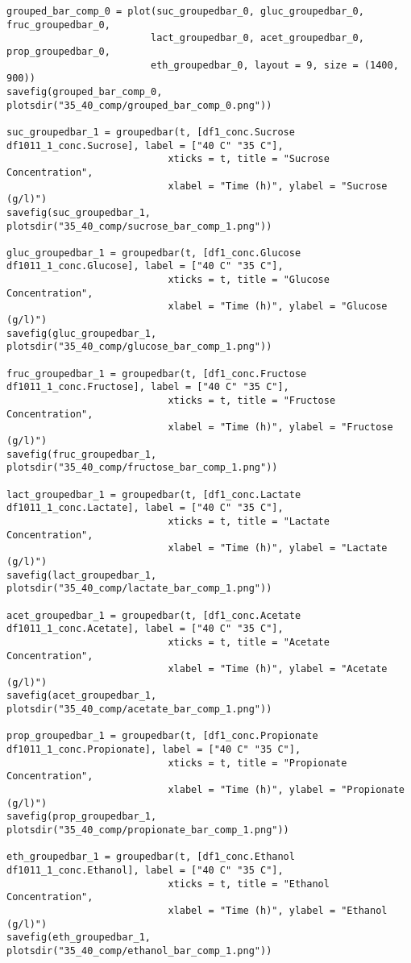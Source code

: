 \documentclass[11pt]{article}
\begin{document}
\begin{verbatim}
grouped_bar_comp_0 = plot(suc_groupedbar_0, gluc_groupedbar_0, fruc_groupedbar_0,
                         lact_groupedbar_0, acet_groupedbar_0, prop_groupedbar_0,
                         eth_groupedbar_0, layout = 9, size = (1400, 900))
savefig(grouped_bar_comp_0, plotsdir("35_40_comp/grouped_bar_comp_0.png"))

suc_groupedbar_1 = groupedbar(t, [df1_conc.Sucrose df1011_1_conc.Sucrose], label = ["40 C" "35 C"],
                            xticks = t, title = "Sucrose Concentration",
                            xlabel = "Time (h)", ylabel = "Sucrose (g/l)")
savefig(suc_groupedbar_1, plotsdir("35_40_comp/sucrose_bar_comp_1.png"))

gluc_groupedbar_1 = groupedbar(t, [df1_conc.Glucose df1011_1_conc.Glucose], label = ["40 C" "35 C"],
                            xticks = t, title = "Glucose Concentration",
                            xlabel = "Time (h)", ylabel = "Glucose (g/l)")
savefig(gluc_groupedbar_1, plotsdir("35_40_comp/glucose_bar_comp_1.png"))

fruc_groupedbar_1 = groupedbar(t, [df1_conc.Fructose df1011_1_conc.Fructose], label = ["40 C" "35 C"],
                            xticks = t, title = "Fructose Concentration",
                            xlabel = "Time (h)", ylabel = "Fructose (g/l)")
savefig(fruc_groupedbar_1, plotsdir("35_40_comp/fructose_bar_comp_1.png"))

lact_groupedbar_1 = groupedbar(t, [df1_conc.Lactate df1011_1_conc.Lactate], label = ["40 C" "35 C"],
                            xticks = t, title = "Lactate Concentration",
                            xlabel = "Time (h)", ylabel = "Lactate (g/l)")
savefig(lact_groupedbar_1, plotsdir("35_40_comp/lactate_bar_comp_1.png"))

acet_groupedbar_1 = groupedbar(t, [df1_conc.Acetate df1011_1_conc.Acetate], label = ["40 C" "35 C"],
                            xticks = t, title = "Acetate Concentration",
                            xlabel = "Time (h)", ylabel = "Acetate (g/l)")
savefig(acet_groupedbar_1, plotsdir("35_40_comp/acetate_bar_comp_1.png"))

prop_groupedbar_1 = groupedbar(t, [df1_conc.Propionate df1011_1_conc.Propionate], label = ["40 C" "35 C"],
                            xticks = t, title = "Propionate Concentration",
                            xlabel = "Time (h)", ylabel = "Propionate (g/l)")
savefig(prop_groupedbar_1, plotsdir("35_40_comp/propionate_bar_comp_1.png"))

eth_groupedbar_1 = groupedbar(t, [df1_conc.Ethanol df1011_1_conc.Ethanol], label = ["40 C" "35 C"],
                            xticks = t, title = "Ethanol Concentration",
                            xlabel = "Time (h)", ylabel = "Ethanol (g/l)")
savefig(eth_groupedbar_1, plotsdir("35_40_comp/ethanol_bar_comp_1.png"))


\end{verbatim}
\end{document}
